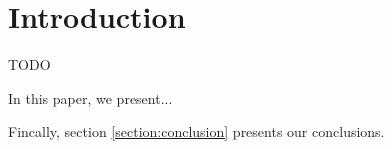 \section{Introduction}
\label{section:introduction}

\cite{TEST:TEST}TODO

In this paper, we present...

Fincally, section \ref{section:conclusion} presents our conclusions.
